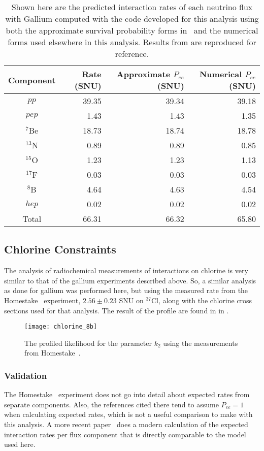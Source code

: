 \begin{table}
\centering
\begin{tabular}{c|r|r|r}
Component & \cite{sagecombo} Rate (SNU) & Approximate $P_{ee}$ (SNU) & Numerical $P_{ee}$ (SNU) \\ \hline
$pp$		& 39.35	&	39.34 	&	39.18	\\
$pep$		& 1.43 	&	1.43 	&	1.35 	\\ 
$^7$Be		& 18.73	&	18.74	& 	18.78	\\
$^{13}$N	& 0.89 	&	0.89	&	0.85	\\ 
$^{15}$O	& 1.23 	&	1.23	&	1.13	\\ 
$^{17}$F	& 0.03 	&	0.03	&	0.03	\\
$^8$B		& 4.64 	&	4.63	&	4.54	\\ 
$hep$		& 0.02 	&	0.02	&	0.02	\\ \hline
Total		& 66.31	&	66.32 	&	65.80	\\ \hline
\end{tabular}
\caption{\label{tbl:gallium}Shown here are the predicted interaction rates of each neutrino flux with Gallium computed with the code developed for this analysis using both the approximate survival probability forms in~\cite{sagecombo} and the numerical forms used elsewhere in this analysis. Results from \cite{sagecombo} are reproduced for reference.}
\end{table}

\subsection{Chlorine Constraints}

The analysis of radiochemical measurements of interactions on chlorine is very similar to that of the gallium experiments described above. 
So, a similar analysis as done for gallium was performed here, but using the measured rate from the Homestake~\cite{homestake} experiment, $2.56\pm0.23$ SNU on $^{37}$Cl, along with the chlorine cross sections used for that analysis.
The result of the profile are found in in .

\begin{figure}
\centering
\texttt{[image: chlorine\_8b]}
\caption{The profiled likelihood for the parameter $k_2$ using the measurements from Homestake~\cite{homestake}.}
\label{fig:cl_profiles}
\end{figure}


\subsubsection{Validation}
The Homestake~\cite{homestake} experiment does not go into detail about expected rates from separate components.
Also, the references cited there tend to assume $P_{ee} = 1$ when calculating expected rates, which is not a useful comparison to make with this analysis.
A more recent paper~\cite{bachall_lma} does a modern calculation of the expected interaction rates per flux component that is directly comparable to the model used here.

